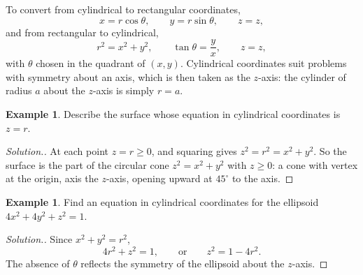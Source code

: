 \documentclass[11pt,a4paper]{article}
\theoremstyle{definition}
\newtheorem{exa}[thm]{Example}
\newenvironment{solution}
  {\renewcommand{\qedsymbol}{}\begin{proof}[\textit{Solution}.]}
  {\end{proof}}
\begin{document}
\begin{figure}[H]
\centering
{}
\end{figure}

To convert from cylindrical to rectangular coordinates,
\[x = r\cos \theta ,\qquad  y = r\sin \theta ,\qquad  z =z ,\]
and from rectangular to cylindrical,
\[r^2 = x^2 + y^2 , \qquad  \tan \theta = \frac{y}{x} ,\qquad  z =z ,\]
with $\theta$ chosen in the quadrant of $(x,y)$. Cylindrical coordinates suit
problems with symmetry about an axis, which is then taken as the $z$-axis: the
cylinder of radius $a$ about the $z$-axis is simply $r = a$.

\begin{exa}
\label{ex:conecyl}
Describe the surface whose equation in cylindrical coordinates is $z = r$.
\end{exa}

\begin{solution}
At each point $z = r\geq 0$, and squaring gives $z^2 = r^2 = x^2 + y^2$. So the
surface is the part of the circular cone $z^2 = x^2 + y^2$ with $z\geq 0$: a cone
with vertex at the origin, axis the $z$-axis, opening upward at $45^\circ$ to the
axis.
\end{solution}

\begin{exa}
\label{ex:ellipsoidcyl}
Find an equation in cylindrical coordinates for the ellipsoid
$4x^2 + 4y^2 + z^2 =1$.
\end{exa}

\begin{solution}
Since $x^2 + y^2 = r^2$,
\[4r^2 + z^2 =1,\qquad\text{or}\qquad z^2 = 1 - 4r^2 .\]
The absence of $\theta$ reflects the symmetry of the ellipsoid about the
$z$-axis.
\end{solution}
\end{document}

